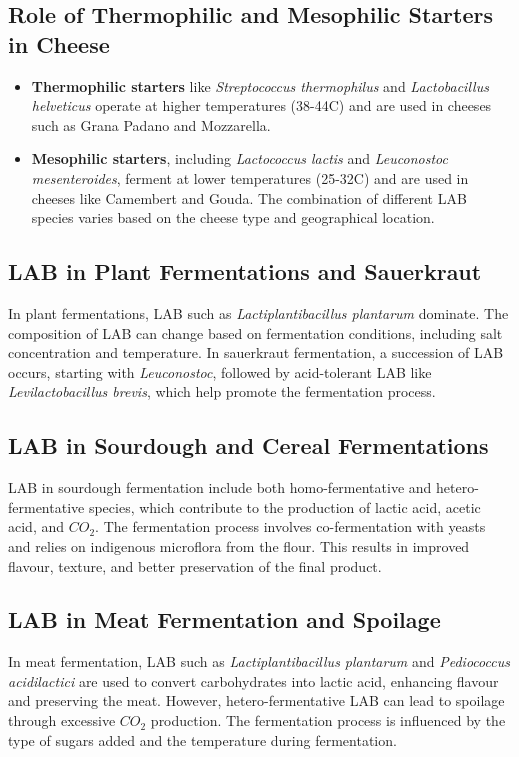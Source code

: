 \subsection{Role of Thermophilic and Mesophilic Starters in Cheese} 
\begin{highlight}
    \begin{itemize}
        \item \textbf{Thermophilic starters} like \textit{Streptococcus thermophilus} and \textit{Lactobacillus helveticus} operate at higher temperatures (38-44\textdegree C) and are used in cheeses such as Grana Padano and Mozzarella.
        \item \textbf{Mesophilic starters}, including \textit{Lactococcus lactis} and \textit{Leuconostoc mesenteroides}, ferment at lower temperatures (25-32\textdegree C) and are used in cheeses like Camembert and Gouda. The combination of different LAB species varies based on the cheese type and geographical location.
    \end{itemize}
\end{highlight}

\subsection{LAB in Plant Fermentations and Sauerkraut}
In plant fermentations, LAB such as \textit{Lactiplantibacillus plantarum} dominate. The composition of LAB can change based on fermentation conditions, including salt concentration and temperature. In sauerkraut fermentation, a succession of LAB occurs, starting with \textit{Leuconostoc}, followed by acid-tolerant LAB like \textit{Levilactobacillus brevis}, which help promote the fermentation process.

\subsection{LAB in Sourdough and Cereal Fermentations} 
LAB in sourdough fermentation include both homo-fermentative and hetero-fermentative species, which contribute to the production of lactic acid, acetic acid, and $CO_2$. The fermentation process involves co-fermentation with yeasts and relies on indigenous microflora from the flour. This results in improved flavour, texture, and better preservation of the final product.

\subsection{LAB in Meat Fermentation and Spoilage}
In meat fermentation, LAB such as \textit{Lactiplantibacillus plantarum} and \textit{Pediococcus acidilactici} are used to convert carbohydrates into lactic acid, enhancing flavour and preserving the meat. However, hetero-fermentative LAB can lead to spoilage through excessive $CO_2$ production. The fermentation process is influenced by the type of sugars added and the temperature during fermentation.

